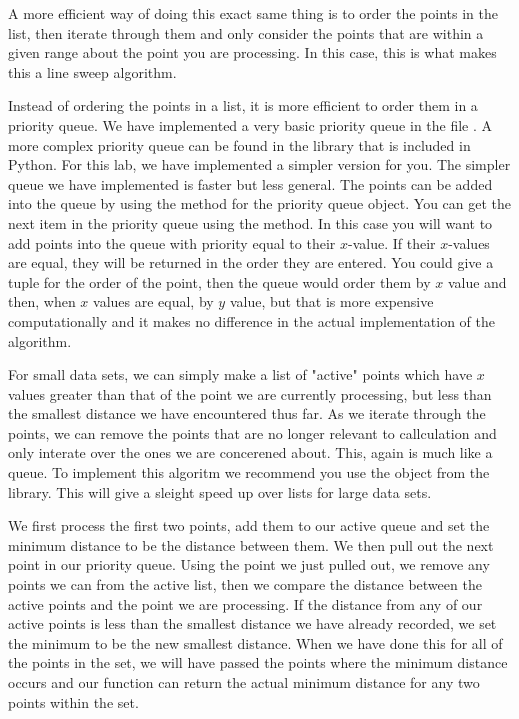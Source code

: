 A more efficient way of doing this exact same thing is to order the points in the list, then iterate through them and only consider the points that are within a given range about the point you are processing. In this case, this is what makes this a line sweep algorithm. 

Instead of ordering the points in a list, it is more efficient to order them in a priority queue. We have implemented a very basic priority queue in the file . A more complex priority queue can be found in the library  that is included in Python. For this lab, we have implemented a simpler version for you. The simpler queue we have implemented is faster but less general. The points can be added into the queue by using the  method for the priority queue object. You can get the next item in the priority queue using the  method. In this case you will want to add points into the queue with priority equal to their $x$-value. If their $x$-values are equal, they will be returned in the order they are entered. You could give a tuple for the order of the point, then the queue would order them by $x$ value and then, when $x$ values are equal, by $y$ value, but that is more expensive computationally and it makes no difference in the actual implementation of the algorithm. 

For small data sets, we can simply make a list of "active" points which have $x$ values greater than that of the point we are currently processing, but less than the smallest distance we have encountered thus far. As we iterate through the points, we can remove the points that are no longer relevant to callculation and only interate over the ones we are concerened about. This, again is much like a queue. To implement this algoritm we recommend you use the  object from the  library. This will give a sleight speed up over lists for large data sets. 

We first process the first two points, add them to our active queue and set the minimum distance to be the distance between them. We then pull out the next point in our priority queue. Using the point we just pulled out, we remove any points we can from the active list, then we compare the distance between the active points and the point we are processing. If the distance from any of our active points is less than the smallest distance we have already recorded, we set the minimum to be the new smallest distance. When we have done this for all of the points in the set, we will have passed the points where the minimum distance occurs and our function can return the actual minimum distance for any two points within the set.

